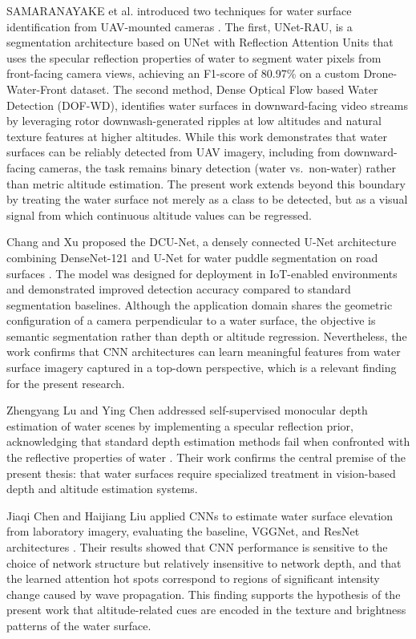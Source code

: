     SAMARANAYAKE et al. introduced two techniques for water surface identification from UAV-mounted cameras \cite{SAMARANAYAKE2023103933}.
    The first, UNet-RAU, is a segmentation architecture based on UNet with Reflection Attention Units that uses the specular reflection properties of water to segment water pixels from front-facing camera views, achieving an F1-score of 80.97\% on a custom Drone-Water-Front dataset.
    The second method, Dense Optical Flow based Water Detection (DOF-WD), identifies water surfaces in downward-facing video streams by leveraging rotor downwash-generated ripples at low altitudes and natural texture features at higher altitudes.
    While this work demonstrates that water surfaces can be reliably detected from UAV imagery, including from downward-facing cameras, the task remains binary detection (water vs.\ non-water) rather than metric altitude estimation.
    The present work extends beyond this boundary by treating the water surface not merely as a class to be detected, but as a visual signal from which continuous altitude values can be regressed.

    Chang and Xu proposed the DCU-Net, a densely connected U-Net architecture combining DenseNet-121 and U-Net for water puddle segmentation on road surfaces \cite{ChangXu2024DCUNet}.
    The model was designed for deployment in IoT-enabled environments and demonstrated improved detection accuracy compared to standard segmentation baselines.
    Although the application domain shares the geometric configuration of a camera perpendicular to a water surface, the objective is semantic segmentation rather than depth or altitude regression.
    Nevertheless, the work confirms that CNN architectures can learn meaningful features from water surface imagery captured in a top-down perspective, which is a relevant finding for the present research.

    Zhengyang Lu and Ying Chen addressed self-supervised monocular depth estimation of water scenes by implementing a specular reflection prior, acknowledging that standard depth estimation methods fail when confronted with the reflective properties of water \cite{WaterDepthSpecular}.
    Their work confirms the central premise of the present thesis: that water surfaces require specialized treatment in vision-based depth and altitude estimation systems.

    Jiaqi Chen and Haijiang Liu applied CNNs to estimate water surface elevation from laboratory imagery, evaluating the baseline, VGGNet, and ResNet architectures \cite{CHEN2022110819}.
    Their results showed that CNN performance is sensitive to the choice of network structure but relatively insensitive to network depth, and that the learned attention hot spots correspond to regions of significant intensity change caused by wave propagation.
    This finding supports the hypothesis of the present work that altitude-related cues are encoded in the texture and brightness patterns of the water surface.

